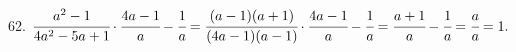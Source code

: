 62. $\cfrac{a^2-1}{4a^2-5a+1}\cdot\cfrac{4a-1}{a}-\cfrac{1}{a}=
\cfrac{(a-1)(a+1)}{(4a-1)(a-1)}\cdot\cfrac{4a-1}{a}-\cfrac{1}{a}=\cfrac{a+1}{a}-\cfrac{1}{a}=\cfrac{a}{a}=1.$\\
